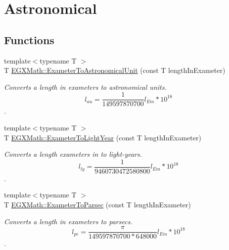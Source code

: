 \hypertarget{group___e_g_x_math-_conversions-_length_conversions-_exameter-_astronomical}{}\section{Astronomical}
\label{group___e_g_x_math-_conversions-_length_conversions-_exameter-_astronomical}
\subsection*{Functions}
\begin{DoxyCompactItemize}
\item 
{\footnotesize template$<$typename T $>$ }\\T \mbox{\hyperlink{group___e_g_x_math-_conversions-_length_conversions-_exameter-_astronomical_gafe75957564bfe2508c37089fece97c41}{E\+G\+X\+Math\+::\+Exameter\+To\+Astronomical\+Unit}} (const T length\+In\+Exameter)
\begin{DoxyCompactList}\small\item\em Converts a length in exameters to astronomical units. \[ l_{au}= \frac{1}{149597870700} l_{Em} * 10^{18} \]. \end{DoxyCompactList}\item 
{\footnotesize template$<$typename T $>$ }\\T \mbox{\hyperlink{group___e_g_x_math-_conversions-_length_conversions-_exameter-_astronomical_ga3867a3c149542e86e92d12147fd6d34e}{E\+G\+X\+Math\+::\+Exameter\+To\+Light\+Year}} (const T length\+In\+Exameter)
\begin{DoxyCompactList}\small\item\em Converts a length exameters in to light-\/years. \[ l_{ly}= \frac{1}{9460730472580800} l_{Em} * 10^{18} \]. \end{DoxyCompactList}\item 
{\footnotesize template$<$typename T $>$ }\\T \mbox{\hyperlink{group___e_g_x_math-_conversions-_length_conversions-_exameter-_astronomical_ga807fef0b23d3c3c9b4a11c26bcd36b6e}{E\+G\+X\+Math\+::\+Exameter\+To\+Parsec}} (const T length\+In\+Exameter)
\begin{DoxyCompactList}\small\item\em Converts a length in exameters to parsecs. \[ l_{pc}=\frac{\pi}{149597870700 * 648000} l_{Em} * 10^{18} \]. \end{DoxyCompactList}\end{DoxyCompactItemize}


